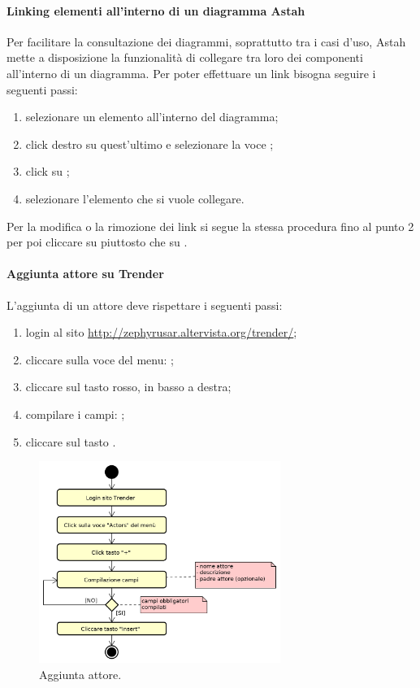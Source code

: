 	    \paragraph{Linking elementi all'interno di un diagramma Astah}
	    Per facilitare la consultazione dei diagrammi, soprattutto tra i casi d'uso, Astah mette a disposizione la funzionalità di collegare tra loro dei componenti all'interno di un diagramma. Per poter effettuare un link bisogna seguire i seguenti passi:
	    \begin{enumerate}
	    	\item selezionare un elemento all'interno del diagramma;
	    	\item click destro su quest'ultimo e selezionare la voce ;
	    	\item click su ;
	    	\item selezionare l'elemento che si vuole collegare.
	    \end{enumerate}
	    Per la modifica o la rimozione dei link si segue la stessa procedura fino al punto 2 per poi cliccare su  piuttosto che su .
	    \paragraph{Aggiunta attore su Trender}
	    L'aggiunta di un attore deve rispettare i seguenti passi:
	    \begin{enumerate}
	    	\item login al sito \url{http://zephyrusar.altervista.org/trender/};
		    \item cliccare sulla voce del menu: ;
			\item cliccare sul tasto \hicode{+} rosso, in basso a destra;
			\item compilare i campi: ;
	    	\item cliccare sul tasto .
	    \end{enumerate}
	    \begin{figure}[H]
	    	\centering
	    	\includegraphics[width=0.7\textwidth]{img/AggiuntaAttore}
	    	\caption{Aggiunta attore.}
	    \end{figure}
